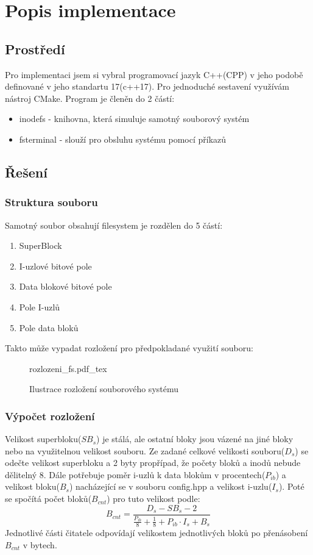 \documentclass[12pt, a4paper]{report}
\newcommand{\incfig}[1]{%
    \def\svgwidth{\columnwidth}
    {#1.pdf_tex}
}
\begin{document}
\chapter{Popis implementace}
\section{Prostředí}
Pro implementaci jsem si vybral programovací jazyk C++(CPP) v jeho podobě definované v jeho standartu 17(c++17). Pro jednoduché sestavení využívám nástroj CMake. Program je členěn do 2 částí:
\begin{itemize}
 \item inodefs - knihovna, která simuluje samotný souborový systém
 \item fsterminal - slouží pro obsluhu systému pomocí příkazů
\end{itemize}

\section{Řešení}
\subsection{Struktura souboru}
Samotný soubor obsahují filesystem je rozdělen do 5 částí:
\begin{enumerate}
 \item SuperBlock
 \item I-uzlové bitové pole
 \item Data blokové bitové pole
 \item Pole I-uzlů
 \item Pole data bloků
\end{enumerate}
Takto může vypadat rozložení pro předpokladané využití souboru:\linebreak
\begin{figure}[H]
\centering
\incfig{rozlozeni_fs}
\caption{Ilustrace rozložení souborového systému}
\end{figure} 
\subsection{Výpočet rozložení}
Velikost superbloku($SB_s$) je stálá, ale ostatní bloky jsou vázené na jiné bloky nebo na využitelnou velikost souboru.
Ze zadané celkové velikosti souboru($D_s$) se odečte velikost superbloku a 2 byty propřípad, že počety bloků a inodů nebude dělitelný 8.
Dále potřebuje poměr i-uzlů k data blokům v procentech($P_{ib}$) a velikost bloku($B_s$) nacházející se v souboru \ttfamily config.hpp
\normalfont a velikost i-uzlu($I_s$). Poté se spočítá počet bloků($B_{cnt}$) pro tuto velikost podle:
\[B_{cnt} = \frac{D_s - SB_s - 2}{\frac{P_{ib}}{8} + \frac{1}{8} + P_{ib}
\cdot I_s + B_s}\]
Jednotlivé části čitatele odpovídají velikostem jednotlivých bloků po přenásobení $B_{cnt}$ v bytech.
\end{document}
